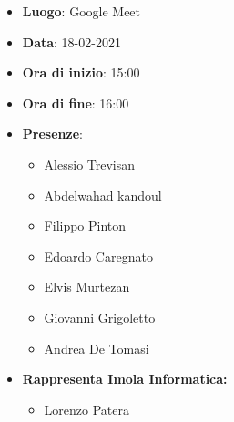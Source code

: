 \begin{itemize}
    \item \textbf{Luogo}: Google Meet
    \item \textbf{Data}: 18-02-2021
    \item \textbf{Ora di inizio}: 15:00
    \item \textbf{Ora di fine}: 16:00
    \item \textbf{Presenze}:
          \begin{itemize}
            \item Alessio Trevisan
            \item Abdelwahad kandoul
            \item Filippo Pinton
            \item Edoardo Caregnato
            \item Elvis Murtezan
            \item Giovanni Grigoletto
            \item Andrea De Tomasi
          \end{itemize}
    \item \textbf{Rappresenta Imola Informatica:}
    \begin{itemize}
        \item Lorenzo Patera
    \end{itemize}
\end{itemize}